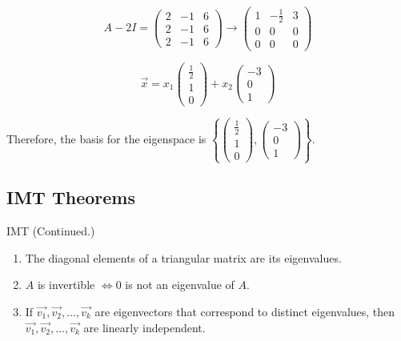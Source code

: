 \begin{equation}
    A - 2 I = \begin{pmatrix}
    2 & -1 & 6 \\
    2 & -1 & 6 \\
    2 & -1 & 6
\end{pmatrix} \rightarrow \begin{pmatrix}
    1 & -\frac{1}{2} & 3 \\
    0 & 0 & 0 \\
    0 & 0 & 0
\end{pmatrix}
\end{equation}

\begin{equation}
    \Vec{x} = x_1 \begin{pmatrix}
        \frac{1}{2}  \\ 1 \\ 0 
    \end{pmatrix} + x_2 \begin{pmatrix}
        -3 \\ 0 \\ 1
    \end{pmatrix}
\end{equation}

\noindent
Therefore, the basis for the eigenspace is \(\left\{\begin{pmatrix}
        \frac{1}{2}  \\ 1 \\ 0 
    \end{pmatrix},\begin{pmatrix}
        -3 \\ 0 \\ 1
    \end{pmatrix}\right\}\).

\subsection{IMT Theorems}
\begin{theorem} IMT (Continued.)
    \begin{enumerate}
        \item The diagonal elements of a triangular matrix are its eigenvalues.
        \item \(A\) is invertible \(\Leftrightarrow 0\) is not an eigenvalue of \(A\).
        \item If \(\Vec{v_1}, \Vec{v_2}, \dots, \Vec{v_k}\) are eigenvectors that correspond to distinct eigenvalues, then \(\Vec{v_1}, \Vec{v_2}, \dots, \Vec{v_k}\) are linearly independent.
    \end{enumerate}
\end{theorem}

